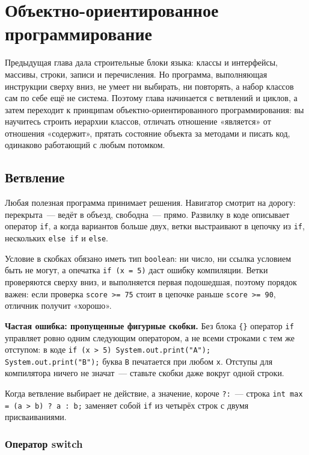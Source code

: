 \chapter{Объектно-ориентированное программирование}
\label{ch:03}

Предыдущая глава дала строительные блоки языка: классы и интерфейсы, массивы,
строки, записи и перечисления. Но программа, выполняющая инструкции сверху
вниз, не умеет ни выбирать, ни повторять, а набор классов сам по себе
ещё не система. Поэтому глава начинается с ветвлений и циклов, а затем
переходит к принципам объектно-ориентированного программирования: вы научитесь
строить иерархии классов, отличать отношение «является» от отношения
«содержит», прятать состояние объекта за методами и писать код, одинаково
работающий с любым потомком.

\section{Ветвление}

Любая полезная программа принимает решения. Навигатор смотрит на дорогу:
перекрыта~--- ведёт в объезд, свободна~--- прямо. Развилку в коде описывает
оператор \texttt{if}, а когда вариантов больше двух, ветки выстраивают в
цепочку из \texttt{if}, нескольких \texttt{else if} и \texttt{else}.

Условие в скобках обязано иметь тип \texttt{boolean}: ни число, ни ссылка
условием быть не могут, а опечатка \texttt{if (x = 5)} даст ошибку компиляции.
Ветки проверяются сверху вниз, и выполняется первая подошедшая, поэтому порядок
важен: если проверка \texttt{score >= 75} стоит в цепочке раньше
\texttt{score >= 90}, отличник получит «хорошо».

\begin{oshibka}
\textbf{Частая ошибка: пропущенные фигурные скобки.} Без блока \texttt{\{\}}
оператор \texttt{if} управляет ровно одним следующим оператором, а не всеми
строками с тем же отступом: в коде
\texttt{if (x > 5) System.out.print("A"); System.out.print("B");} буква
\texttt{B} печатается при любом \texttt{x}. Отступы для компилятора ничего не
значат~--- ставьте скобки даже вокруг одной строки.
\end{oshibka}

Когда ветвление выбирает не действие, а значение, короче  \texttt{?:}~--- строка \texttt{int max = (a > b) ? a : b;} заменяет
собой \texttt{if} из четырёх строк с двумя присваиваниями.

\subsection{Оператор switch}

